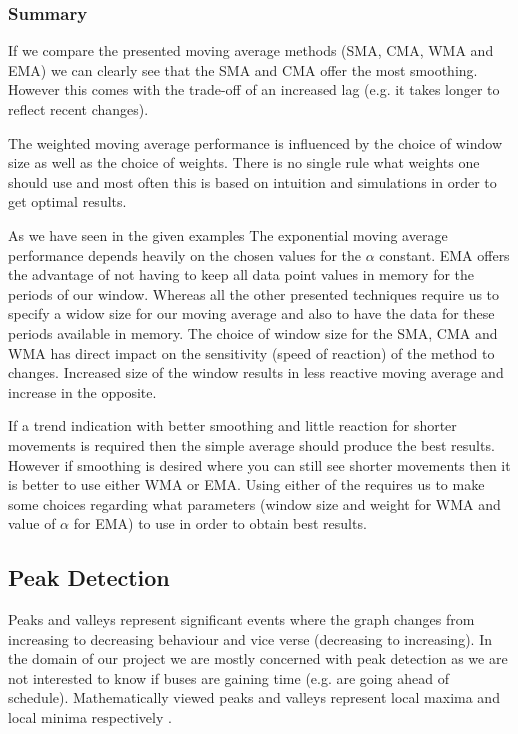 \subsubsection{Summary}
If we compare the presented moving average methods (SMA, CMA, WMA and EMA) we can clearly see that the SMA and CMA offer the most smoothing. However this comes with the trade-off of an increased lag (e.g. it takes longer to reflect recent changes). 

The weighted moving average performance is influenced by the choice of window size as well as the choice of weights. There is no single rule what weights one should use and most often this is based on intuition and simulations in order to get optimal results.

As we have seen in the given examples The exponential moving average performance depends heavily on the chosen values for the $\alpha$ constant. EMA offers the advantage of not having to keep all data point values in memory for the periods of our window. Whereas all the other presented techniques require us to specify a widow size for our moving average and also to have the data for these periods available in memory. The choice of window size for the SMA, CMA and WMA has direct impact on the sensitivity (speed of reaction) of the method to changes. Increased size of the window results in less reactive moving average and increase in the opposite.

If a trend indication with better smoothing and little reaction for shorter movements is required then the simple average should produce the best results. However if smoothing is desired where you can still see shorter movements then it is better to use either WMA or EMA. Using either of the requires us to make some choices regarding what parameters (window size and weight for WMA and value of $\alpha$ for EMA) to use in order to obtain best results.


\subsection{Peak Detection}
Peaks and valleys represent significant events where the graph changes from increasing to decreasing behaviour and vice verse (decreasing to increasing). In the domain of our project we are mostly concerned with peak detection as we are not interested to know if buses are gaining time (e.g. are going ahead of schedule). Mathematically viewed peaks and valleys represent local maxima and local minima respectively \cite{simon1994mathematics}.

